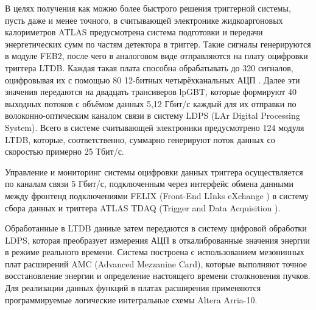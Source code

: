 В целях получения как можно более быстрого решения триггерной системы, пусть даже и менее точного, в считывающей электронике жидкоаргоновых калориметров ATLAS предусмотрена система подготовки и передачи энергетических сумм по частям детектора в триггер. Такие сигналы генерируются в модуле FEB2, после чего в аналоговом виде отправляются на плату оцифровки триггера LTDB. Каждая такая плата способна обрабатывать до 320 сигналов, оцифровывая их с помощью 80 12-битных четырёхканальных АЦП \parencite{ltdb}. Далее эти значения передаются на двадцать трансиверов lpGBT, которые формируют 40 выходных потоков с объёмом данных 5,12 Гбит/с каждый для их отправки по волоконно-оптическим каналом связи в систему LDPS (LAr Digital Processing System). Всего в системе считывающей электроники предусмотрено 124 модуля LTDB, которые, соответственно, суммарно генерируют поток данных со скоростью примерно 25 Тбит/с.\par
Управление и мониторинг системы оцифровки данных триггера осуществляется по каналам связи 5 Гбит/с, подключенным через интерфейс обмена данными между фронтенд подключениями FELIX (Front-End LInks eXchange \parencite{felix}) в систему сбора данных и триггера ATLAS TDAQ (Trigger and Data Acquisition \parencite{tdaq}).\par
Обработанные в LTDB данные затем передаются в систему цифровой обработки LDPS, которая преобразует измерения АЦП в откалиброванные значения энергии в режиме реального времени. Система построена с использованием мезонинных плат расширений AMC (Advanced Mezzanine Card), которые выполняют точное восстановление энергии и определение настоящего времени столкновения пучков. Для реализации данных функций в платах расширения применяются программируемые логические интегральные схемы Altera Arria-10.\par
